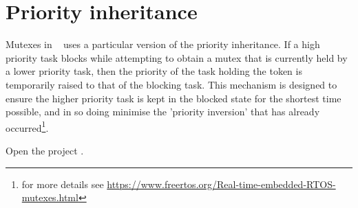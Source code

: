 \section{Priority inheritance}

Mutexes in \rtos~ uses a particular version of the priority inheritance. 
If a high priority task blocks while attempting to obtain a mutex that is currently held by a lower priority task, then the priority of the task holding the token is temporarily raised to that of the blocking task. This mechanism is designed to ensure the higher priority task is kept in the blocked state for the shortest time possible, and in so doing minimise the 'priority inversion' that has already occurred\footnote{for more details see \url{https://www.freertos.org/Real-time-embedded-RTOS-mutexes.html}}.

Open the project .

